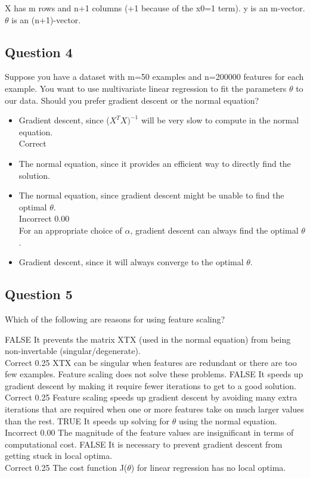 X has m rows and n+1 columns (+1 because of the x0=1 term). y is an m-vector. $\theta$ is an (n+1)-vector.
\subsection*{Question 4}
Suppose you have a dataset with m=50 examples and n=200000 features for each example. 
You want to use multivariate linear regression to fit the parameters $\theta$ to our data. 
Should you prefer gradient descent or the normal equation?

\begin{itemize}
\item Gradient descent, since ($X^TX)^{-1}$ will be very slow to compute in the normal equation.	
\\ Correct
		
\item The normal equation, since it provides an efficient way to directly find the solution.			
\item The normal equation, since gradient descent might be unable to find the optimal $\theta$.	
\\Incorrect	0.00	 \\ For an appropriate choice of $\alpha$, gradient descent can always find the optimal $\theta$.
\item Gradient descent, since it will always converge to the optimal $\theta$.			
\end{itemize}	
\subsection*{Question 5}
Which of the following are reasons for using feature scaling?

FALSE It prevents the matrix XTX (used in the normal equation) from being non-invertable (singular/degenerate).	
\\Correct	0.25	 XTX can be singular when features are redundant or there are too few examples. Feature scaling does not solve these problems.
FALSE It speeds up gradient descent by making it require fewer iterations to get to a good solution.	
\\Correct	0.25	 Feature scaling speeds up gradient descent by avoiding many extra iterations that are required when one or more features take on much larger values than the rest.
TRUE It speeds up solving for $\theta$ using the normal equation.	
\\Incorrect	0.00	 The magnitude of the feature values are insignificant in terms of computational cost.
FALSE It is necessary to prevent gradient descent from getting stuck in local optima.	
\\Correct	0.25	 The cost function J($\theta$) for linear regression has no local optima.

